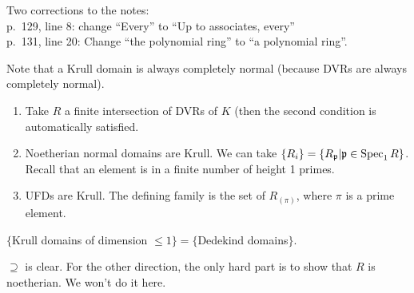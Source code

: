  \setcounter{lecture}{40}

 Two corrections to the notes:\\
 p.~129, line 8: change ``Every'' to ``Up to associates, every''\\
 p.~131, line 20: Change ``the polynomial ring'' to ``a polynomial ring''.

 Note that a Krull domain is always completely normal (because DVRs are always completely
 normal).

 \begin{example}
   \begin{enumerate}
     \item Take $R$ a finite intersection of DVRs of $K$ (then the second condition is
     automatically satisfied.
     \item Noetherian normal domains are Krull. We can take $\{R_i\}=\{R_{\mathfrak{p}}|\mathfrak{p}\in \operatorname{Spec}_1
     R\}$. Recall that an element is in a finite number of height 1 primes.
     \item UFDs are Krull. The defining family is the set of $R_{(\pi)}$, where $\pi$ is
     a prime element.
   \end{enumerate}
   \vspace*{-1.7\baselineskip}
 \end{example}
 \begin{theorem}
   $\{$Krull domains of dimension $\le 1\} = \{$Dedekind domains$\}$.
 \end{theorem}
 $\supseteq$ is clear. For the other direction, the only hard part is to show that $R$
 is noetherian. We won't do it here.

